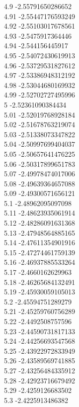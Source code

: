 {4.9	-2.55791650286652\\
4.91	-2.55447176593249\\
4.92	-2.55103017678561\\
4.93	-2.5475917364446\\
4.94	-2.544156445917\\
4.95	-2.54072430619913\\
4.96	-2.53729531827612\\
4.97	-2.53386948312192\\
4.98	-2.53044680169932\\
4.99	-2.52702727495996\\
5	-2.52361090384434\\
5.01	-2.52019768928184\\
5.02	-2.51678763219074\\
5.03	-2.51338073347822\\
5.04	-2.50997699404037\\
5.05	-2.50657641476225\\
5.06	-2.50317899651783\\
5.07	-2.49978474017006\\
5.08	-2.49639364657088\\
5.09	-2.49300571656121\\
5.1	-2.48962095097098\\
5.11	-2.48623935061914\\
5.12	-2.48286091631368\\
5.13	-2.47948564885165\\
5.14	-2.47611354901916\\
5.15	-2.47274461759139\\
5.16	-2.46937885533264\\
5.17	-2.4660162629963\\
5.18	-2.46265684132491\\
5.19	-2.45930059105013\\
5.2	-2.45594751289279\\
5.21	-2.45259760756289\\
5.22	-2.4492508757596\\
5.23	-2.44590731817133\\
5.24	-2.44256693547568\\
5.25	-2.43922972833949\\
5.26	-2.43589569741885\\
5.27	-2.43256484335912\\
5.28	-2.42923716679492\\
5.29	-2.4259126683502\\
5.3	-2.4225913486382\\
}
